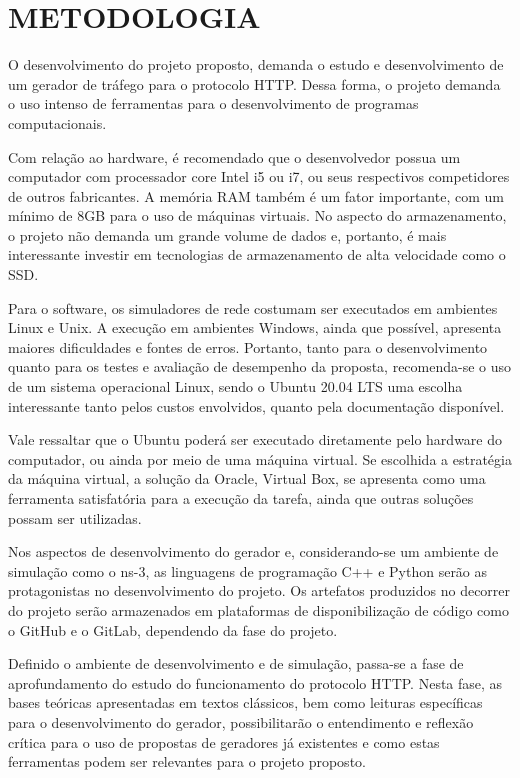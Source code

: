 \newpage

\section{METODOLOGIA}
\label{sec:metodologia}
O desenvolvimento do projeto proposto, demanda o estudo e desenvolvimento de um gerador de tráfego para o protocolo HTTP. Dessa forma, o projeto demanda o uso intenso de ferramentas para o desenvolvimento de programas computacionais.

Com relação ao hardware, é recomendado que o desenvolvedor possua um computador com processador core Intel i5 ou i7, ou seus respectivos competidores de outros fabricantes. A memória RAM também é um fator importante, com um mínimo de 8GB para o uso de máquinas virtuais. No aspecto do armazenamento, o projeto não demanda um grande volume de dados e, portanto, é mais interessante investir em tecnologias de armazenamento de alta velocidade como o SSD.

Para o software, os simuladores de rede costumam ser executados em ambientes Linux e Unix. A execução em ambientes Windows, ainda que possível, apresenta maiores dificuldades e fontes de erros. Portanto, tanto para o desenvolvimento quanto para os testes e avaliação de desempenho da proposta, recomenda-se o uso de um sistema operacional Linux, sendo o Ubuntu 20.04 LTS uma escolha interessante tanto pelos custos envolvidos, quanto pela documentação disponível.

Vale ressaltar que o Ubuntu poderá ser executado diretamente pelo hardware do computador, ou ainda por meio de uma máquina virtual. Se escolhida a estratégia da máquina virtual, a solução da Oracle, Virtual Box, se apresenta como uma ferramenta satisfatória para a execução da tarefa, ainda que outras soluções possam ser utilizadas.

Nos aspectos de desenvolvimento do gerador e, considerando-se um ambiente de simulação como o ns-3, as linguagens de programação C++ e Python serão as protagonistas no desenvolvimento do projeto. Os artefatos produzidos no decorrer do projeto serão armazenados em plataformas de disponibilização de código como o GitHub e o GitLab, dependendo da fase do projeto.

Definido o ambiente de desenvolvimento e de simulação, passa-se a fase de aprofundamento do estudo do funcionamento do protocolo HTTP. Nesta fase, as bases teóricas apresentadas em textos clássicos, bem como leituras específicas para o desenvolvimento do gerador, possibilitarão o entendimento e reflexão crítica para o uso de propostas de geradores já existentes e como estas ferramentas podem ser relevantes para o projeto proposto.

